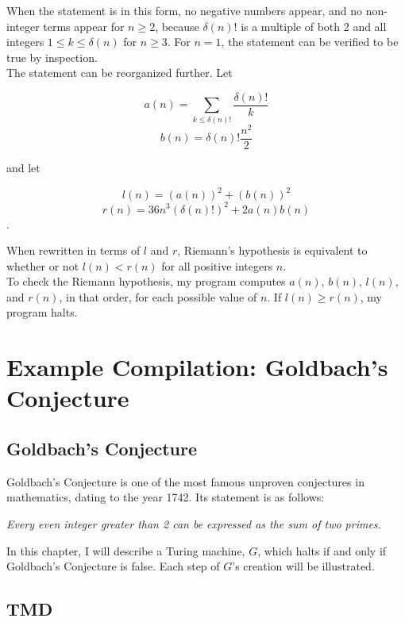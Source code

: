 When the statement is in this form, no negative numbers appear, and no non-integer terms appear for $n \ge 2$, because $\delta(n)!$ is a multiple of both 2 and all integers $1 \le k \le \delta(n)$ for $n \ge 3$. For $n = 1$, the statement can be verified to be true by inspection. \\

The statement can be reorganized further. Let 

$$a(n) = \sum_{k \le \delta(n)!} \frac{\delta(n)!}{k}$$
$$b(n) = \delta(n)!\frac{n^2}{2}$$

and let

$$l(n) = (a(n))^2 + (b(n))^2$$
$$r(n) = 36n^3(\delta(n)!)^2 + 2a(n)b(n)$$.

When rewritten in terms of $l$ and $r$, Riemann's hypothesis is equivalent to whether or not $l(n) < r(n)$ for all positive integers $n$. \\

To check the Riemann hypothesis, my program computes $a(n)$, $b(n)$, $l(n)$, and $r(n)$, in that order, for each possible value of $n$. If $l(n) \ge r(n)$, my program halts.

\chapter{Example Compilation: Goldbach's Conjecture}

\section{Goldbach's Conjecture}

Goldbach's Conjecture is one of the most famous unproven conjectures in mathematics, dating to the year 1742. Its statement is as follows: \\

\begin{statement}
\emph{Every even integer greater than 2 can be expressed as the sum of two primes.}
\label{goldbachstatement}
\end{statement}

In this chapter, I will describe a Turing machine, $G$, which halts if and only if Goldbach's Conjecture is false. Each step of $G$'s creation will be illustrated.

\section{TMD \label{sec:tmdgoldbach}}


